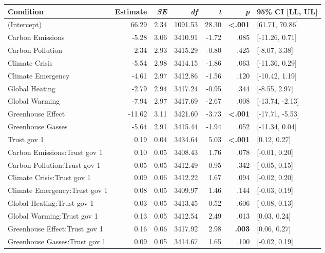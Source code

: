 \begin{table}[ht]
\centering
\begin{tabular}{lrrrrrl}
  \hline
Condition & Estimate & \textit{SE} & \textit{df} & \textit{t} & \textit{p} & 95\% CI [LL, UL] \\ 
  \hline
(Intercept) & 66.29 & 2.34 & 1091.53 & 28.30 & \textbf{\textless  .001} & [61.71, 70.86] \\ 
  Carbon Emissions & -5.28 & 3.06 & 3410.91 & -1.72 & .085 & [-11.26, 0.71] \\ 
  Carbon Pollution & -2.34 & 2.93 & 3415.29 & -0.80 & .425 & [-8.07, 3.38] \\ 
  Climate Crisis & -5.54 & 2.98 & 3414.15 & -1.86 & .063 & [-11.36, 0.29] \\ 
  Climate Emergency & -4.61 & 2.97 & 3412.86 & -1.56 & .120 & [-10.42, 1.19] \\ 
  Global Heating & -2.79 & 2.94 & 3417.24 & -0.95 & .344 & [-8.55, 2.97] \\ 
  Global Warming & -7.94 & 2.97 & 3417.69 & -2.67 & .008 & [-13.74, -2.13] \\ 
  Greenhouse Effect & -11.62 & 3.11 & 3421.60 & -3.73 & \textbf{\textless  .001} & [-17.71, -5.53] \\ 
  Greenhouse Gasses & -5.64 & 2.91 & 3415.44 & -1.94 & .052 & [-11.34, 0.04] \\ 
  Trust gov 1 & 0.19 & 0.04 & 3434.64 & 5.03 & \textbf{\textless  .001} & [0.12, 0.27] \\ 
  Carbon Emissions:Trust gov 1 & 0.10 & 0.05 & 3408.43 & 1.76 & .078 & [-0.01, 0.20] \\ 
  Carbon Pollution:Trust gov 1 & 0.05 & 0.05 & 3412.49 & 0.95 & .342 & [-0.05, 0.15] \\ 
  Climate Crisis:Trust gov 1 & 0.09 & 0.06 & 3412.22 & 1.67 & .094 & [-0.02, 0.20] \\ 
  Climate Emergency:Trust gov 1 & 0.08 & 0.05 & 3409.97 & 1.46 & .144 & [-0.03, 0.19] \\ 
  Global Heating:Trust gov 1 & 0.03 & 0.05 & 3413.45 & 0.52 & .606 & [-0.08, 0.13] \\ 
  Global Warming:Trust gov 1 & 0.13 & 0.05 & 3412.54 & 2.49 & .013 & [0.03, 0.24] \\ 
  Greenhouse Effect:Trust gov 1 & 0.16 & 0.06 & 3417.92 & 2.98 & \textbf{.003} & [0.06, 0.27] \\ 
  Greenhouse Gasses:Trust gov 1 & 0.09 & 0.05 & 3414.67 & 1.65 & .100 & [-0.02, 0.19] \\ 
   \hline
\end{tabular}
\end{table}

